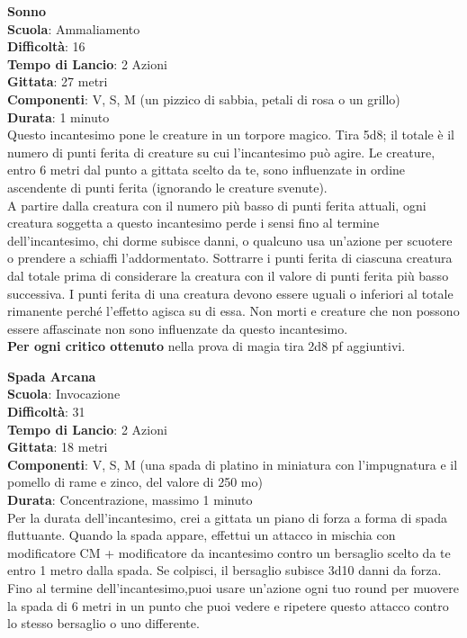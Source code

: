 \begin{multicols}{2}
\medskip\textbf{Sonno}\\
\textbf{Scuola}: Ammaliamento\\
\textbf{Difficoltà}: 16\\
\textbf{Tempo di Lancio}: 2 Azioni\\
\textbf{Gittata}: 27 metri\\
\textbf{Componenti}: V, S, M (un pizzico di sabbia, petali di rosa o un grillo)\\
\textbf{Durata}: 1 minuto\\
Questo incantesimo pone le creature in un torpore magico. Tira 5d8; il totale è il numero di punti ferita di creature su cui l'incantesimo può agire. Le creature, entro 6 metri dal punto a gittata scelto da te, sono influenzate in ordine ascendente di punti ferita (ignorando le creature svenute).\\
A partire dalla creatura con il numero più basso di punti ferita attuali, ogni creatura soggetta a questo incantesimo perde i sensi fino al termine dell'incantesimo, chi dorme subisce danni, o qualcuno usa un'azione per scuotere o prendere a schiaffi l'addormentato. Sottrarre i punti ferita di ciascuna creatura dal totale prima di considerare la creatura con il valore di punti ferita più basso successiva. I punti ferita di una creatura devono essere uguali o inferiori al totale rimanente perché l'effetto agisca su di essa. Non morti e creature che non possono essere affascinate non sono influenzate da questo incantesimo.\\
\textbf{Per ogni critico ottenuto} nella prova di magia tira 2d8 pf aggiuntivi.

\medskip\textbf{Spada Arcana}\\
\textbf{Scuola}: Invocazione\\
\textbf{Difficoltà}: 31\\
\textbf{Tempo di Lancio}: 2 Azioni\\
\textbf{Gittata}: 18 metri\\
\textbf{Componenti}: V, S, M (una spada di platino in miniatura con l'impugnatura e il pomello di rame e zinco, del valore di 250 mo)\\
\textbf{Durata}: Concentrazione, massimo 1 minuto \\
Per la durata dell'incantesimo, crei a gittata un piano di forza a forma di spada fluttuante. Quando la spada appare, effettui un attacco in mischia con modificatore CM + modificatore da incantesimo contro un bersaglio scelto da te entro 1 metro dalla spada. Se colpisci, il bersaglio subisce 3d10 danni da forza. Fino al termine dell'incantesimo,puoi usare un'azione ogni tuo round per muovere la spada di 6 metri in un punto che puoi vedere e ripetere questo attacco contro lo stesso bersaglio o uno differente.


\end{multicols}
